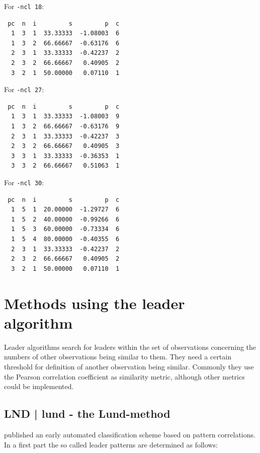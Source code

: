 \documentclass[12pt, oneside, a4paper, headsepline, plainheadsepline]{scrbook}
\begin{document}
For \verb+-ncl 18+:
\begin{scriptsize}
\begin{lstlisting}
 pc  n  i         s         p  c
  1  3  1  33.33333  -1.08003  6
  1  3  2  66.66667  -0.63176  6
  2  3  1  33.33333  -0.42237  2
  2  3  2  66.66667   0.40905  2
  3  2  1  50.00000   0.07110  1
\end{lstlisting}
\end{scriptsize}

For \verb+-ncl 27+:
\begin{scriptsize}
\begin{lstlisting}
 pc  n  i         s         p  c
  1  3  1  33.33333  -1.08003  9
  1  3  2  66.66667  -0.63176  9
  2  3  1  33.33333  -0.42237  3
  2  3  2  66.66667   0.40905  3
  3  3  1  33.33333  -0.36353  1
  3  3  2  66.66667   0.51063  1
\end{lstlisting}
\end{scriptsize}

For \verb+-ncl 30+:
\begin{scriptsize}
\begin{lstlisting}
 pc  n  i         s         p  c
  1  5  1  20.00000  -1.29727  6
  1  5  2  40.00000  -0.99266  6
  1  5  3  60.00000  -0.73334  6
  1  5  4  80.00000  -0.40355  6
  2  3  1  33.33333  -0.42237  2
  2  3  2  66.66667   0.40905  2
  3  2  1  50.00000   0.07110  1
\end{lstlisting}
\end{scriptsize}
\section{Methods using the leader algorithm}

Leader algorithms \citep{Hartigan1975} search for leaders within the set of 
observations concerning the numbers of other observations being similar to them.
They need a certain threshold for definition of another observation being similar.
Commonly they use the Pearson correlation coefficient as similarity metric, although
other metrics could be implemented.

\subsection{LND | lund - the Lund-method }\label{LND}

\citet{Lund1963} published an early automated classification scheme based
on pattern correlations. In a first part the so called leader patterns are determined 
as follows:
\end{document}
